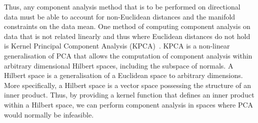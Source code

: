 \begin{figure}[t]
\begin{minipage}[t]{.45\textwidth}
\label{fig:singl_img_united_nations}
	\end{minipage}
\end{figure}
Thus, any component analysis method that is to be performed on directional data
must be able to account for non-Euclidean distances and the manifold constraints
on the data mean. One method of computing component analysis on data that is
not related linearly and thus where Euclidean distances do not hold is
Kernel Principal Component Analysis (KPCA)~\cite{scholkopf1998nonlinear}.
KPCA is a non-linear generalisation of PCA that allows the computation
of component analysis within arbitrary dimensional Hilbert spaces,
including the subspace of normals. A Hilbert space is a generalisation
of a Euclidean space to arbitrary dimensions. More specifically, a Hilbert
space is a vector space possessing the structure of an inner
product. Thus, by providing a kernel function that defines
an inner product within a Hilbert space, we can perform component analysis in
spaces where PCA would normally be infeasible.

